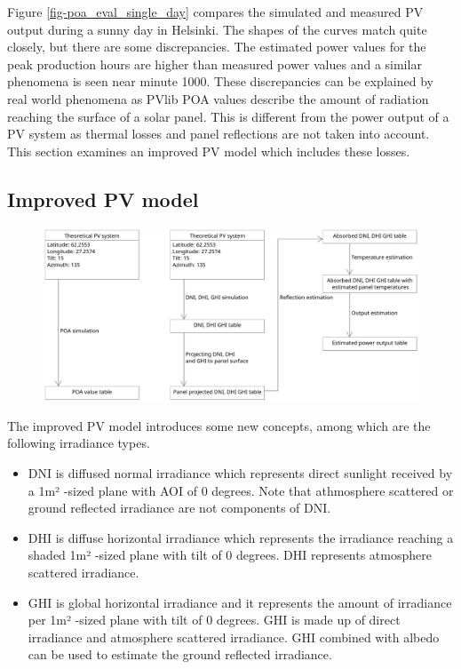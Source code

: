 \noindent Figure \ref{fig-poa_eval_single_day} compares the simulated and measured PV output during a sunny day in Helsinki. The shapes of the curves match quite closely, but there are some discrepancies. The estimated power values for the peak production hours are higher than measured power values and a similar phenomena is seen near minute 1000. These discrepancies can be explained by real world phenomena as PVlib POA values describe the amount of radiation reaching the surface of a solar panel. This is different from the power output of a PV system as thermal losses and panel reflections are not taken into account. This section examines an improved PV model which includes these losses.

\newpage

\subsection{Improved PV model}

\begin{figure}[h]
\centering
\includegraphics[width=1.0\linewidth]{pics/uml2}
\captionsetup{labelformat=empty}
\label{fig-pv_model}
\end{figure}


\noindent 
The improved PV model introduces some new concepts, among which are the following irradiance types.

\begin{itemize}
\item DNI is diffused normal irradiance which represents direct sunlight received by a 1m² -sized plane with AOI of 0 degrees. Note that athmosphere scattered or ground reflected irradiance are not components of DNI.

\item DHI is diffuse horizontal irradiance which represents the irradiance reaching a shaded 1m² -sized plane with tilt of 0 degrees. DHI represents atmosphere scattered irradiance.

\item GHI is global horizontal irradiance and it represents the amount of irradiance per 1m² -sized plane with tilt of 0 degrees. GHI is made up of direct irradiance and atmosphere scattered irradiance. GHI combined with albedo can be used to estimate the ground reflected irradiance.
\end{itemize}


